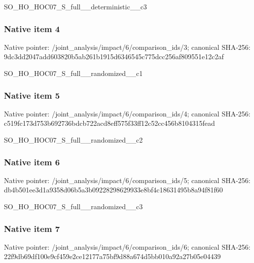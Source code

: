\documentclass[10pt,a4paper]{article}
\begin{document}
\begingroup\raggedright\sloppy SO\_\allowbreak{}HO\_\allowbreak{}HOC07\_\allowbreak{}S\_\allowbreak{}full\_\allowbreak{}\_\allowbreak{}deterministic\_\allowbreak{}\_\allowbreak{}c3\par\endgroup

\subsubsection{Native item 4}
Native pointer: /joint\_\allowbreak{}analysis/impact/6/comparison\_\allowbreak{}ids/3; canonical SHA-256: 9dc3dd2047add603820b5ab261b1915d6346545c775dcc256af809551e12c2af

\begingroup\raggedright\sloppy SO\_\allowbreak{}HO\_\allowbreak{}HOC07\_\allowbreak{}S\_\allowbreak{}full\_\allowbreak{}\_\allowbreak{}randomized\_\allowbreak{}\_\allowbreak{}c1\par\endgroup

\subsubsection{Native item 5}
Native pointer: /joint\_\allowbreak{}analysis/impact/6/comparison\_\allowbreak{}ids/4; canonical SHA-256: c519fc173d753b692736bdcb722acd8eff575f33ff12c52cc456b8104315fead

\begingroup\raggedright\sloppy SO\_\allowbreak{}HO\_\allowbreak{}HOC07\_\allowbreak{}S\_\allowbreak{}full\_\allowbreak{}\_\allowbreak{}randomized\_\allowbreak{}\_\allowbreak{}c2\par\endgroup

\subsubsection{Native item 6}
Native pointer: /joint\_\allowbreak{}analysis/impact/6/comparison\_\allowbreak{}ids/5; canonical SHA-256: db4b501ee3d1a9358d06b5a3b09228298629933e8bf4c18631495b8a94f81f60

\begingroup\raggedright\sloppy SO\_\allowbreak{}HO\_\allowbreak{}HOC07\_\allowbreak{}S\_\allowbreak{}full\_\allowbreak{}\_\allowbreak{}randomized\_\allowbreak{}\_\allowbreak{}c3\par\endgroup

\subsubsection{Native item 7}
Native pointer: /joint\_\allowbreak{}analysis/impact/6/comparison\_\allowbreak{}ids/6; canonical SHA-256: 22f9db69df100e9cf459e2ce12177a75bf9d88a674d5bb010a92a27b05e04439
\end{document}
